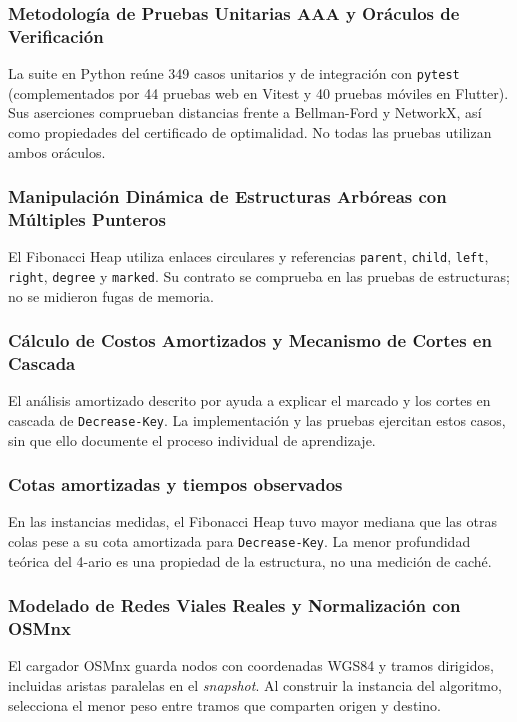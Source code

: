 \subsubsection{Metodología de Pruebas Unitarias AAA y Oráculos de Verificación}
La suite en Python reúne 349 casos unitarios y de integración con \texttt{pytest} (complementados por 44 pruebas web en Vitest y 40 pruebas móviles en Flutter). Sus aserciones comprueban distancias frente a Bellman-Ford y NetworkX, así como propiedades del certificado de optimalidad. No todas las pruebas utilizan ambos oráculos.

\subsubsection{Manipulación Dinámica de Estructuras Arbóreas con Múltiples Punteros}
El Fibonacci Heap utiliza enlaces circulares y referencias \texttt{parent}, \texttt{child}, \texttt{left}, \texttt{right}, \texttt{degree} y \texttt{marked}. Su contrato se comprueba en las pruebas de estructuras; no se midieron fugas de memoria.

\subsubsection{Cálculo de Costos Amortizados y Mecanismo de Cortes en Cascada}
El análisis amortizado descrito por \textcite{tarjan1983data} ayuda a explicar el marcado y los cortes en cascada de \texttt{Decrease-Key}. La implementación y las pruebas ejercitan estos casos, sin que ello documente el proceso individual de aprendizaje.

\subsubsection{Cotas amortizadas y tiempos observados}
En las instancias medidas, el Fibonacci Heap tuvo mayor mediana que las otras colas pese a su cota amortizada para \texttt{Decrease-Key}. La menor profundidad teórica del 4-ario es una propiedad de la estructura, no una medición de caché.

\subsubsection{Modelado de Redes Viales Reales y Normalización con OSMnx}
El cargador OSMnx \parencite{boeing2025osmnx} guarda nodos con coordenadas WGS84 y tramos dirigidos, incluidas aristas paralelas en el \textit{snapshot}. Al construir la instancia del algoritmo, selecciona el menor peso entre tramos que comparten origen y destino.

